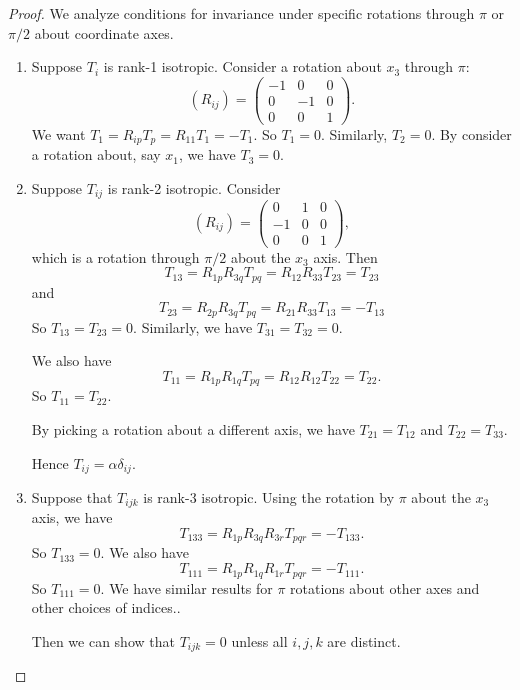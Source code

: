 \documentclass[a4paper]{article}
\begin{document}
\begin{proof}
  We analyze conditions for invariance under specific rotations through $\pi$ or $\pi/2$ about coordinate axes.

  \begin{enumerate}
    \item Suppose $T_i$ is rank-1 isotropic. Consider a rotation about $x_3$ through $\pi$:
      \[
        (R_{ij}) =
        \begin{pmatrix}
          -1 & 0 & 0\\
          0 & -1 & 0\\
          0 & 0 & 1
        \end{pmatrix}.
      \]
      We want $T_1 = R_{ip}T_p = R_{11} T_1 = -T_1$. So $T_1 = 0$. Similarly, $T_2 = 0$. By consider a rotation about, say $x_1$, we have $T_3 = 0$.
    \item Suppose $T_{ij}$ is rank-2 isotropic. Consider
      \[
        (R_{ij}) =
        \begin{pmatrix}
          0 & 1 & 0\\
          -1 & 0 & 0\\
          0 & 0 & 1
        \end{pmatrix},
      \]
      which is a rotation through $\pi/2$ about the $x_3$ axis. Then
      \[
        T_{13} = R_{1p}R_{3q} T_{pq} = R_{12}R_{33}T_{23} = T_{23}
      \]
      and
      \[
        T_{23} = R_{2p}R_{3q} T_{pq} = R_{21}R_{33}T_{13} = -T_{13}
      \]
      So $T_{13} = T_{23} = 0$. Similarly, we have $T_{31} = T_{32} = 0$.

      We also have
      \[
        T_{11} = R_{1p} R_{1q} T_{pq} = R_{12} R_{12}T_{22} = T_{22}.
      \]
      So $T_{11} = T_{22}$.

      By picking a rotation about a different axis, we have $T_{21} = T_{12}$ and $T_{22} = T_{33}$.

      Hence $T_{ij} = \alpha \delta_{ij}$.

    \item Suppose that $T_{ijk}$ is rank-3 isotropic. Using the rotation by $\pi$ about the $x_3$ axis, we have
      \[
        T_{133} = R_{1p}R_{3q}R_{3r}T_{pqr} = -T_{133}.
      \]
      So $T_{133} = 0$. We also have
      \[
        T_{111} = R_{1p}R_{1q}R_{1r}T_{pqr} = -T_{111}.
      \]
      So $T_{111} = 0$. We have similar results for $\pi$ rotations about other axes and other choices of indices..

      Then we can show that $T_{ijk} = 0$ unless all $i, j, k$ are distinct.


\end{enumerate}
\end{proof}
\end{document}
